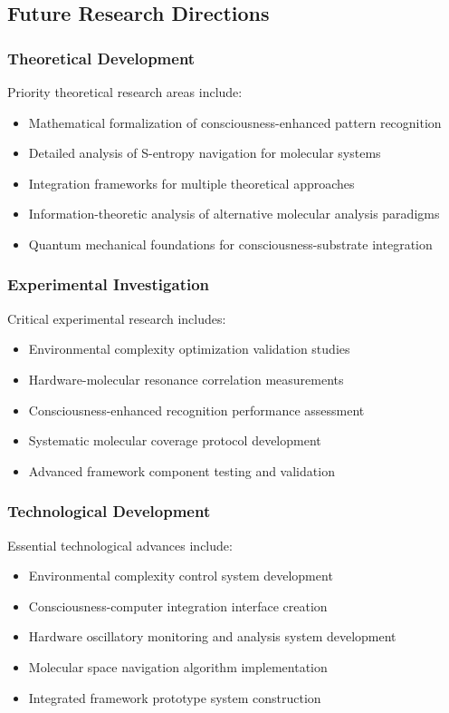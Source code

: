 \documentclass[11pt,a4paper]{article}
\theoremstyle{remark}
\begin{document}
{{{{{{{{{{\subsection{Future Research Directions}

\subsubsection{Theoretical Development}

Priority theoretical research areas include:
\begin{itemize}
\item Mathematical formalization of consciousness-enhanced pattern recognition
\item Detailed analysis of S-entropy navigation for molecular systems
\item Integration frameworks for multiple theoretical approaches
\item Information-theoretic analysis of alternative molecular analysis paradigms
\item Quantum mechanical foundations for consciousness-substrate integration
\end{itemize}

\subsubsection{Experimental Investigation}

Critical experimental research includes:
\begin{itemize}
\item Environmental complexity optimization validation studies
\item Hardware-molecular resonance correlation measurements
\item Consciousness-enhanced recognition performance assessment
\item Systematic molecular coverage protocol development
\item Advanced framework component testing and validation
\end{itemize}

\subsubsection{Technological Development}

Essential technological advances include:
\begin{itemize}
\item Environmental complexity control system development
\item Consciousness-computer integration interface creation
\item Hardware oscillatory monitoring and analysis system development
\item Molecular space navigation algorithm implementation
\item Integrated framework prototype system construction
\end{itemize}

}}}}}}}}}}
\end{document}
